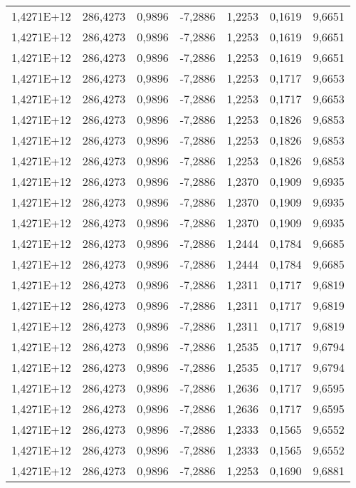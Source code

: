 \begin{table}[htbp]
\begin{tabular}{rrrrrrr}
    1,4271E+12 & 286,4273 & 0,9896 & -7,2886 & 1,2253 & 0,1619 & 9,6651 \\
    1,4271E+12 & 286,4273 & 0,9896 & -7,2886 & 1,2253 & 0,1619 & 9,6651 \\
    1,4271E+12 & 286,4273 & 0,9896 & -7,2886 & 1,2253 & 0,1619 & 9,6651 \\
    1,4271E+12 & 286,4273 & 0,9896 & -7,2886 & 1,2253 & 0,1717 & 9,6653 \\
    1,4271E+12 & 286,4273 & 0,9896 & -7,2886 & 1,2253 & 0,1717 & 9,6653 \\
    1,4271E+12 & 286,4273 & 0,9896 & -7,2886 & 1,2253 & 0,1826 & 9,6853 \\
    1,4271E+12 & 286,4273 & 0,9896 & -7,2886 & 1,2253 & 0,1826 & 9,6853 \\
    1,4271E+12 & 286,4273 & 0,9896 & -7,2886 & 1,2253 & 0,1826 & 9,6853 \\
    1,4271E+12 & 286,4273 & 0,9896 & -7,2886 & 1,2370 & 0,1909 & 9,6935 \\
    1,4271E+12 & 286,4273 & 0,9896 & -7,2886 & 1,2370 & 0,1909 & 9,6935 \\
    1,4271E+12 & 286,4273 & 0,9896 & -7,2886 & 1,2370 & 0,1909 & 9,6935 \\
    1,4271E+12 & 286,4273 & 0,9896 & -7,2886 & 1,2444 & 0,1784 & 9,6685 \\
    1,4271E+12 & 286,4273 & 0,9896 & -7,2886 & 1,2444 & 0,1784 & 9,6685 \\
    1,4271E+12 & 286,4273 & 0,9896 & -7,2886 & 1,2311 & 0,1717 & 9,6819 \\
    1,4271E+12 & 286,4273 & 0,9896 & -7,2886 & 1,2311 & 0,1717 & 9,6819 \\
    1,4271E+12 & 286,4273 & 0,9896 & -7,2886 & 1,2311 & 0,1717 & 9,6819 \\
    1,4271E+12 & 286,4273 & 0,9896 & -7,2886 & 1,2535 & 0,1717 & 9,6794 \\
    1,4271E+12 & 286,4273 & 0,9896 & -7,2886 & 1,2535 & 0,1717 & 9,6794 \\
    1,4271E+12 & 286,4273 & 0,9896 & -7,2886 & 1,2636 & 0,1717 & 9,6595 \\
    1,4271E+12 & 286,4273 & 0,9896 & -7,2886 & 1,2636 & 0,1717 & 9,6595 \\
    1,4271E+12 & 286,4273 & 0,9896 & -7,2886 & 1,2333 & 0,1565 & 9,6552 \\
    1,4271E+12 & 286,4273 & 0,9896 & -7,2886 & 1,2333 & 0,1565 & 9,6552 \\
    1,4271E+12 & 286,4273 & 0,9896 & -7,2886 & 1,2253 & 0,1690 & 9,6881 \\

\end{tabular}
\end{table}
